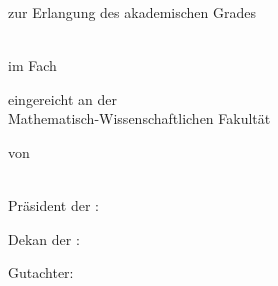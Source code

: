 
\makeatletter
\begin{titlepage}
\begin{spacing}{1}
  \setlength{\parindentbak}{\parindent}
  \setlength{\parskipbak}{\parskip}

\setlength{\parindent}{0pt}
\setlength{\parskip}{\baselineskip}

\thispagestyle{empty}

\expandafter\Hu@titlepagefont\expandafter

\begin{center}
{\LARGE \textbf{\ifx\Hu@doctitle\empty{}\else\Hu@doctitle\fi}}


zur Erlangung des akademischen Grades

\ifx\Hu@degree\empty{}\else\Hu@degree\fi\\
im Fach
\ifx\Hu@subject\empty{}\else\Hu@subject\fi

eingereicht an der\\
Mathematisch-Wissenschaftlichen Fakult\"at\\
\ifx\Hu@university\empty{}\else\Hu@university\fi

von\\
\textbf{\ifx\Hu@authorprefix\empty{}\else\Hu@authorprefix\fi\ \ifx\Hu@authorfirstname\empty{}\else\Hu@authorfirstname\fi\ \ifx\Hu@authorsurname\empty{}\else\Hu@authorsurname\fi\ \ifx\Hu@authorsuffix\empty{}%
\else\Hu@authorsuffix\fi}\\
\ifx\Hu@authoradd\empty{}\else\Hu@authoradd\fi
\end{center}

\vfill

Pr\"asident der \ifx\Hu@university\empty{}\else\Hu@university\fi:\\
\ifx\Hu@president\empty{}\else\Hu@president\fi

Dekan der \ifx\Hu@faculty\empty{}\else\Hu@faculty\fi:\\
\ifx\Hu@dean\empty{}\else\Hu@dean\fi

Gutachter:
\begin{tplist} 
  \ifx\Hu@approvala\empty\item {}\else\item \Hu@approvala\fi
  \ifx\Hu@approvalb\empty\else\item \Hu@approvalb\fi
  \ifx\Hu@approvalc\empty\else\item \Hu@approvalc\fi
  \ifx\Hu@approvald\empty\else\item \Hu@approvald\fi
  \ifx\Hu@approvale\empty\else\item \Hu@approvale\fi
\end{tplist}


\end{spacing}
\end{titlepage}
